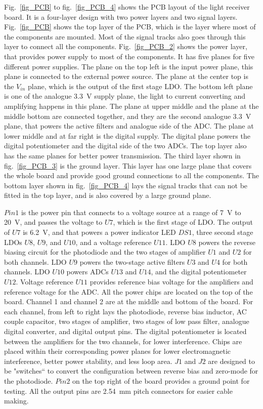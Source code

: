Fig.~\ref{fig_PCB} to fig.~\ref{fig_PCB_4} shows the PCB layout of the light receiver board.  It is a four-layer design with two power layers and two signal layers.  Fig.~\ref{fig_PCB} shows the top layer of the PCB, which is the layer where most of the components are mounted.  Most of the signal tracks also goes through this layer to connect all the components.  Fig.~\ref{fig_PCB_2} shows the power layer, that provides power supply to most of the components.  It has five planes for five different power supplies.  The plane on the top left is the input power plane, this plane is connected to the external power source.  The plane at the center top is the $V_{in}$ plane, which is the output of the first stage LDO.  The bottom left plane is one of the analogue \qty{3.3}{V} supply plane, the light to current converting and amplifying happens in this plane. The plane at upper middle and the plane at the middle bottom are connected together, and they are the second analogue \qty{3.3}{V} plane, that powers the active filters and analogue side of the ADC.  The plane at lower middle and at far right is the digital supply.  The digital plane powers the digital potentiometer and the digital side of the two ADCs.  The top layer also has the same planes for better power transmission.  The third layer shown in fig.~\ref{fig_PCB_3} is the ground layer.  This layer has one large plane that covers the whole board and provide good ground connections to all the components.  The bottom layer shown in fig.~\ref{fig_PCB_4} lays the signal tracks that can not be fitted in the top layer, and is also covered by a large ground plane.

$Pin1$ is the power pin that connects to a voltage source at a range of \qty{7}{V} to \qty{20}{V}, and passes the voltage to $U7$, which is the first stage of LDO.  The output of $U7$ is \qty{6.2}{V}, and that powers a power indicator LED $DS1$, three second stage LDOs $U8$, $U9$, and $U10$, and a voltage reference $U11$.  LDO $U8$ powers the reverse biasing circuit for the photodiode and the two stages of amplifier $U1$ and $U2$ for both channels.  LDO $U9$ powers the two-stage active filters $U3$ and $U4$ for both channels.  LDO $U10$ powers ADCs $U13$ and $U14$, and the digital potentiometer $U12$.  Voltage reference $U11$ provides reference bias voltage for the amplifiers and reference voltage for the ADC.  All the power chips are located on the top of the board.  Channel 1 and channel 2 are at the middle and bottom of the board.  For each channel, from left to right lays the photodiode, reverse bias inductor, AC couple capacitor, two stages of amplifier, two stages of low pass filter, analogue digital converter, and digital output pins.  The digital potentiometer is located between the amplifiers for the two channels, for lower interference.  Chips are placed within their corresponding power planes for lower electromagnetic interference, better power stability, and less loop area.  $J1$ and $J2$ are designed to be "switches`` to convert the configuration between reverse bias and zero-mode for the photodiode.  $Pin2$ on the top right of the board provides a ground point for testing.  All the output pins are \qty{2.54}{mm} pitch connectors for easier cable making.


